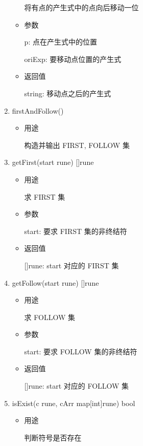 \documentclass[fontset=none,UTF8,a4paper,zihao=-4]{ctexart}
\begin{document}
\begin{enumerate}
\begin{itemize}
将有点的产生式中的点向后移动一位

\item 参数

p: 点在产生式中的位置

oriExp: 要移动点位置的产生式

\item 返回值

string: 移动点之后的产生式
\end{itemize}

\item firstAndFollow()

\begin{itemize}
\item 用途

构造并输出 FIRST, FOLLOW 集
\end{itemize}

\item getFirst(start rune) []rune

\begin{itemize}
\item 用途

求 FIRST 集

\item 参数

start: 要求 FIRST 集的非终结符

\item 返回值

[]rune: start 对应的 FIRST 集
\end{itemize}

\item getFollow(start rune) []rune

\begin{itemize}
\item 用途

求 FOLLOW 集

\item 参数

start: 要求 FOLLOW 集的非终结符

\item 返回值

[]rune: start 对应的 FOLLOW 集
\end{itemize}

\item isExist(c rune, cArr map[int]rune) bool

\begin{itemize}
\item 用途

判断符号是否存在


\end{itemize}
\end{enumerate}
\end{document}
